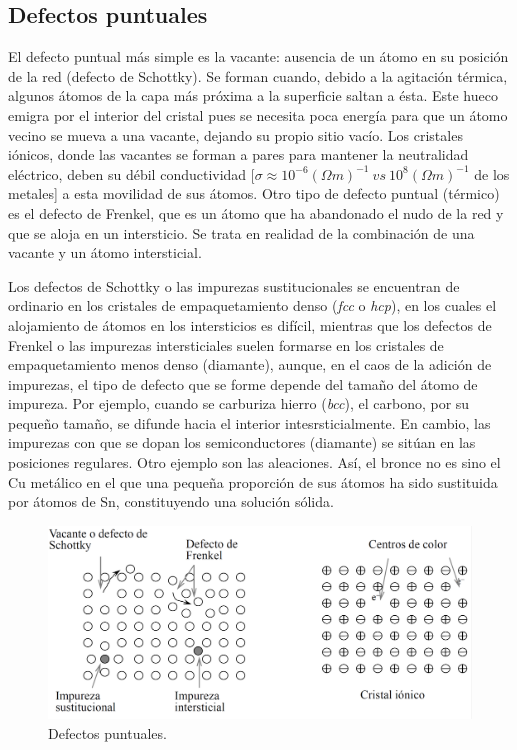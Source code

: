 \subsection{Defectos puntuales} \label{Subsec:01-06-01}

El defecto puntual más simple es la vacante: ausencia de un átomo en su posición de la red (defecto de Schottky). Se forman cuando, debido a la agitación térmica, algunos átomos de la capa más próxima a la superficie saltan a ésta. Este hueco emigra por el interior del cristal pues se necesita poca energía para que un átomo vecino se mueva a una vacante, dejando su propio sitio vacío. Los cristales iónicos, donde las vacantes se forman a pares para mantener la neutralidad eléctrico, deben su débil conductividad $[ \sigma \approx 10^{-6} (\Omega m)^{-1} \ vs \ 10^8 (\Omega m)^{-1}$ de los metales] a esta movilidad de sus  átomos. Otro tipo de defecto puntual (térmico) es el defecto de Frenkel, que es un átomo que ha abandonado el nudo de la red y que se aloja en un intersticio. Se trata en realidad de la combinación de una vacante y un átomo intersticial. %

Los defectos de Schottky o las impurezas sustitucionales se encuentran de ordinario en los cristales de empaquetamiento denso ({\it fcc} o {\it hcp}), en los cuales el alojamiento de átomos en los intersticios es difícil, mientras que los defectos de Frenkel o las impurezas intersticiales suelen formarse en los cristales de empaquetamiento menos denso (diamante), aunque, en el caos de la adición de impurezas, el tipo de defecto que se forme depende del tamaño del átomo de impureza. Por ejemplo, cuando se carburiza hierro ({\it bcc}), el carbono, por su pequeño tamaño, se difunde hacia el interior intesrsticialmente. En cambio, las impurezas con que se dopan los semiconductores (diamante) se sitúan en las posiciones regulares. Otro ejemplo son las aleaciones. Así, el bronce no es sino el Cu metálico en el que una pequeña proporción de sus átomos ha sido sustituida por átomos de Sn, constituyendo una solución sólida. 

\begin{figure}[h!] \centering
    \includegraphics[scale=0.42]{Cuerpo/Ch_01/defectos.png}
    \caption{Defectos puntuales.}
\end{figure}



